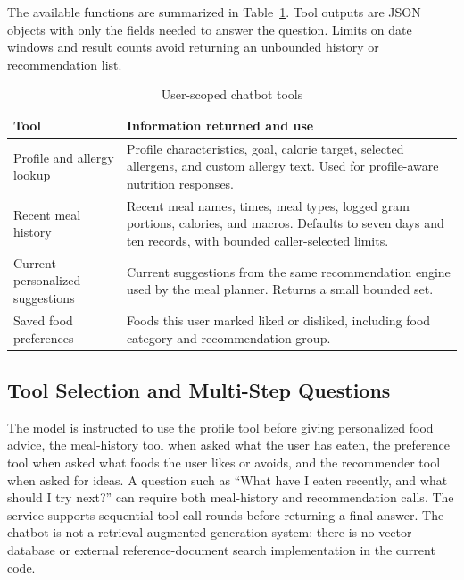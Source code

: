 \documentclass[12pt,a4paper]{report}
\begin{document}
\begin{center}
\end{center}

The available functions are summarized in Table~\ref{tab:chatbot-tools}. Tool outputs
are JSON objects with only the fields needed to answer the question. Limits on date
windows and result counts avoid returning an unbounded history or recommendation list.

\begin{table}[H]
\centering
\caption{User-scoped chatbot tools}
\label{tab:chatbot-tools}
\small
\begin{tabularx}{\textwidth}{p{}p{}}
\toprule
Tool & Information returned and use\\
\midrule
Profile and allergy lookup & Profile characteristics, goal, calorie target,
selected allergens, and custom allergy text. Used for profile-aware nutrition responses.\\
Recent meal history & Recent meal names, times, meal types, logged
gram portions, calories, and macros. Defaults to seven days and ten records, with
bounded caller-selected limits.\\
Current personalized suggestions & Current suggestions from the
same recommendation engine used by the meal planner. Returns a small bounded set.\\
Saved food preferences & Foods this user marked liked or disliked,
including food category and recommendation group.\\
\bottomrule
\end{tabularx}
\end{table}

\subsection{Tool Selection and Multi-Step Questions}
The model is instructed to use the profile tool before giving personalized food advice,
the meal-history tool when asked what the user has eaten, the preference tool when asked
what foods the user likes or avoids, and the recommender tool when asked for ideas. A
question such as ``What have I eaten recently, and what should I try next?'' can require
both meal-history and recommendation calls. The service supports sequential tool-call
rounds before returning a final answer. The chatbot is not a retrieval-augmented
generation system: there is no vector database or external reference-document search
implementation in the current code.
\end{document}
